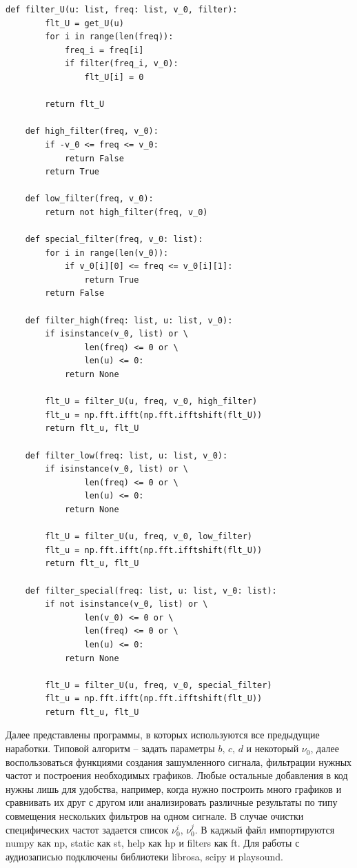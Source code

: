 \documentclass[a4paper, 12pt]{article}
\begin{document}
    \begin{lstlisting}[label=l4, caption={Файл filters.py. Реализация фильтров.}]
    def filter_U(u: list, freq: list, v_0, filter):
        flt_U = get_U(u)
        for i in range(len(freq)):
            freq_i = freq[i]
            if filter(freq_i, v_0):
                flt_U[i] = 0
    
        return flt_U
    
    def high_filter(freq, v_0):
        if -v_0 <= freq <= v_0:
            return False
        return True
    
    def low_filter(freq, v_0):
        return not high_filter(freq, v_0)
    
    def special_filter(freq, v_0: list):
        for i in range(len(v_0)):
            if v_0[i][0] <= freq <= v_0[i][1]:
                return True
        return False
    
    def filter_high(freq: list, u: list, v_0):
        if isinstance(v_0, list) or \
                len(freq) <= 0 or \
                len(u) <= 0:
            return None
    
        flt_U = filter_U(u, freq, v_0, high_filter)
        flt_u = np.fft.ifft(np.fft.ifftshift(flt_U))
        return flt_u, flt_U
    
    def filter_low(freq: list, u: list, v_0):
        if isinstance(v_0, list) or \
                len(freq) <= 0 or \
                len(u) <= 0:
            return None
    
        flt_U = filter_U(u, freq, v_0, low_filter)
        flt_u = np.fft.ifft(np.fft.ifftshift(flt_U))
        return flt_u, flt_U
    
    def filter_special(freq: list, u: list, v_0: list):
        if not isinstance(v_0, list) or \
                len(v_0) <= 0 or \
                len(freq) <= 0 or \
                len(u) <= 0:
            return None
    
        flt_U = filter_U(u, freq, v_0, special_filter)
        flt_u = np.fft.ifft(np.fft.ifftshift(flt_U))
        return flt_u, flt_U
    \end{lstlisting}


    Далее представлены программы, в которых используются все предыдущие наработки. Типовой алгоритм -- задать
    параметры $b,\,c,\,d$ и некоторый $\nu_0$, далее воспользоваться функциями создания зашумленного сигнала,
    фильтрации нужных частот и построения необходимых графиков. Любые остальные добавления в код нужны лишь
    для удобства, например, когда нужно построить много графиков и сравнивать их друг с другом или анализировать
    различные результаты по типу совмещения нескольких фильтров на одном сигнале. В случае очистки специфических
    частот задается список $\nu_{0}^{i},\,\nu_{0}^{j}$. В каджый файл импортируются numpy как np, static как st,
    help как hp и filters как ft. Для работы с аудиозаписью подключены библиотеки librosa, scipy и playsound.
\end{document}

